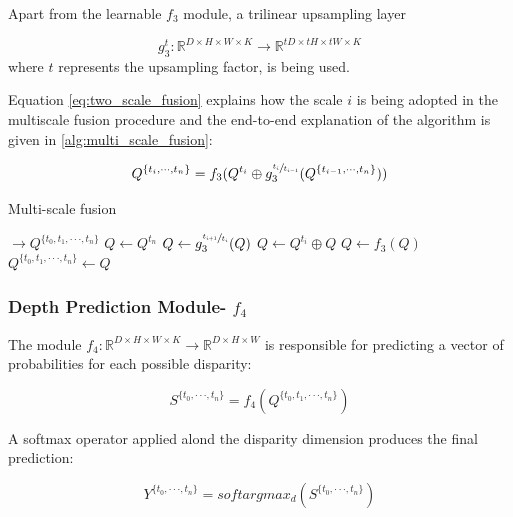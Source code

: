 \documentclass[runningheads]{llncs}
\begin{document}
Apart from the learnable $f_3$ module, a trilinear upsampling layer 

$$g_3^t: \mathbb{R}^{D \times H \times W \times K} \rightarrow \mathbb{R}^{tD \times tH \times tW \times K}$$ where $t$ represents the upsampling factor, is being used. 

Equation \ref{eq:two_scale_fusion} explains how the scale $i$ is being adopted in the multiscale fusion procedure and the end-to-end explanation of the algorithm is given in \ref{alg:multi_scale_fusion}:

\begin{equation} \label{eq:two_scale_fusion}
Q^{ \{ t_i, \cdot \cdot \cdot, t_{n} \} } = f_3(Q^{t_i} \oplus g_3^{\sfrac{t_i}{t_{i-1}} }(Q^{ \{ t_{i-1}, \cdot \cdot \cdot, t_n \} }))
\end{equation}


\begin{algorithm}
\caption{Multi-scale fusion}\label{alg:multi_scale_fusion}
\begin{algorithmic}[1]
 $\rightarrow Q^{\{t_0, t_1, \cdot \cdot \cdot, t_n\}}$ 
\State $Q \gets Q^{t_n}$ 
\State $Q \gets g_3^{\sfrac{ t_{i+1} }{ t_i } }(Q)$ 
\State $Q \gets Q^{t_i} \oplus Q$ 
\State $Q \gets f_3(Q)$ 
\EndFor
\State \Return $Q^{\{t_0, t_1, \cdot \cdot \cdot, t_n\}} \gets Q$ 
\EndProcedure
\end{algorithmic}
\end{algorithm}


\subsubsection{Depth Prediction Module- $f_4$}

The module $f_4: \mathbb{R}^{D \times H \times W \times K} \rightarrow \mathbb{R}^{D \times H \times W}$ is responsible for predicting a vector of probabilities for each possible disparity:

\begin{equation}
S^{\{ t_0, \cdot \cdot \cdot, t_n \}} = f_4(Q^{\{t_0, t_1, \cdot \cdot \cdot, t_n\}})    
\end{equation}{}

A softmax operator applied alond the disparity dimension produces the final prediction:

\begin{equation}
Y^{\{ t_0, \cdot \cdot \cdot, t_n \}} = softargmax_d(S^{\{ t_0, \cdot \cdot \cdot, t_n \}})    
\end{equation}{}
\end{document}
